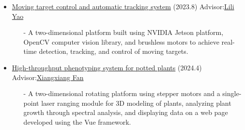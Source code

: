 \documentclass{article}
\begin{document}
\begin{itemize}
    \item \href{https://resume.uint16kun.com/my-projects/Moving%20target%20control%20and%20automatic%20tracking%20system.html}{Moving target control and automatic tracking system} (2023.8)     Advisor:\href{https://xxgcxy.zjhu.edu.cn/2023/0411/c5546a193663/page.htm}{Lili Yao}
          \begin{itemize}
              \item[-] A two-dimensional platform built using NVIDIA Jetson platform, OpenCV computer vision library, and brushless motors to achieve real-time detection, tracking, and control of moving targets.
          \end{itemize}
    \item \href{https://resume.uint16kun.com/my-projects/High-throughput%20phenotyping%20system%20for%20potted%20plants.html}{High-throughput phenotyping system for potted plants} (2024.4)     Advisor:\href{https://xxgcxy.zjhu.edu.cn/2021/0326/c5544a166633/page.htm}{Xiangxiang Fan}    
          \begin{itemize}
              \item[-] A two-dimensional rotating platform using stepper motors and a single-point laser ranging module for 3D modeling of plants, analyzing plant growth through spectral analysis, and displaying data on a web page developed using the Vue framework.
          \end{itemize}

\end{itemize}
\end{document}
